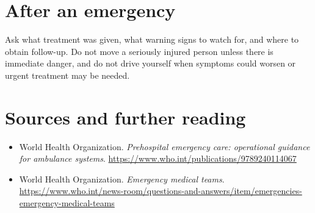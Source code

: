 \section*{After an emergency}
Ask what treatment was given, what warning signs to watch for, and where to obtain follow-up. Do not move a seriously injured person unless there is immediate danger, and do not drive yourself when symptoms could worsen or urgent treatment may be needed.

\section*{Sources and further reading}
\begin{itemize}
\item World Health Organization. \textit{Prehospital emergency care: operational guidance for ambulance systems}. \url{https://www.who.int/publications/9789240114067}
\item World Health Organization. \textit{Emergency medical teams}. \url{https://www.who.int/news-room/questions-and-answers/item/emergencies-emergency-medical-teams}
\end{itemize}
